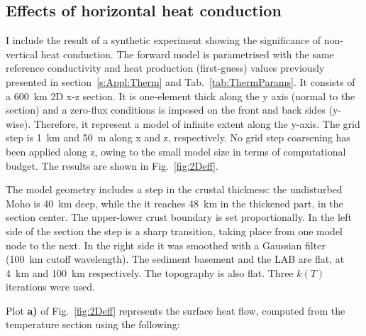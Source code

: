 \begin{subappendices}
\FloatBarrier

\subsection{Effects of horizontal heat conduction}
\label{ss:ApplSup:MethodTests:HorQ}

I include the result of a synthetic experiment showing the significance of non-vertical heat conduction.
The forward model is parametrised with the same reference conductivity and heat production (first-guess) values previously presented in section~\ref{s:Appl:Therm} and Tab.~\ref{tab:ThermParams}.
It consists of a 600~\si{\kilo \metre} 2D x-z section.
It is one-element thick along the y axis (normal to the section) and a zero-flux conditions is imposed on the front and back sides (y-wise).
Therefore, it represent a model of infinite extent along the y-axis.
The grid step is 1~\si{\kilo \metre} and 50~m along x and z, respectively.
No grid step coarsening has been applied along z, owing to the small model size in terms of computational budget.
The results are shown in Fig.~\ref{fig:2Deff}.

The model geometry includes a step in the crustal thickness: the undisturbed Moho is 40~\si{\kilo \metre} deep, while the it reaches 48~\si{\kilo \metre} in the thickened part, in the section center.
The upper-lower crust boundary is set proportionally.
In the left side of the section the step is a sharp transition, taking place from one model node to the next.
In the right side it was smoothed with a Gaussian filter (100~\si{\kilo \metre} cutoff wavelength).
The sediment basement and the LAB are flat, at 4~\si{\kilo \metre} and 100~\si{\kilo \metre} respectively.
The topography is also flat.
Three $k(T)$ iterations were used.

Plot \textbf{a)} of Fig.~\ref{fig:2Deff} represents the surface heat flow, computed from the temperature section using the following:


\end{subappendices}
